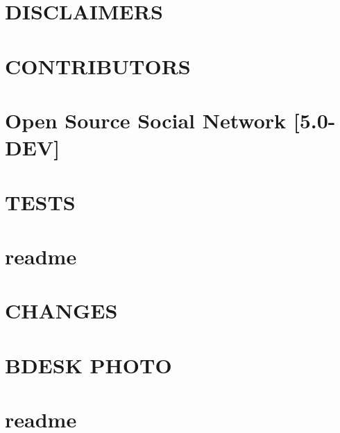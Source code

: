 \documentclass[twoside]{book}
\newcommand{\+}{\discretionary{\mbox{\scriptsize$\hookleftarrow$}}{}{}}
\begin{document}
\chapter{D\+I\+S\+C\+L\+A\+I\+M\+E\+RS}
\label{md__home_jj_Projects_ASN_CONTRIBUTING}
\hypertarget{md__home_jj_Projects_ASN_CONTRIBUTING}{}

\chapter{C\+O\+N\+T\+R\+I\+B\+U\+T\+O\+RS}
\label{md__home_jj_Projects_ASN_CONTRIBUTORS}
\hypertarget{md__home_jj_Projects_ASN_CONTRIBUTORS}{}

\chapter{Open Source Social Network \mbox{[}5.0-\/\+D\+EV\mbox{]}}
\label{md__home_jj_Projects_ASN_README}
\hypertarget{md__home_jj_Projects_ASN_README}{}

\chapter{T\+E\+S\+TS}
\label{md__home_jj_Projects_ASN_TESTS}
\hypertarget{md__home_jj_Projects_ASN_TESTS}{}

\chapter{readme}
\label{md__home_jj_Projects_ASN_vendors_tinymce_langs_readme}
\hypertarget{md__home_jj_Projects_ASN_vendors_tinymce_langs_readme}{}

\chapter{C\+H\+A\+N\+G\+ES}
\label{md__home_jj_Projects_ASN_vendors_tinymce_plugins_bdesk_photo_CHANGES}
\hypertarget{md__home_jj_Projects_ASN_vendors_tinymce_plugins_bdesk_photo_CHANGES}{}

\chapter{B\+D\+E\+SK P\+H\+O\+TO}
\label{md__home_jj_Projects_ASN_vendors_tinymce_plugins_bdesk_photo_README}
\hypertarget{md__home_jj_Projects_ASN_vendors_tinymce_plugins_bdesk_photo_README}{}

\chapter{readme}
\label{md__home_jj_Projects_ASN_vendors_tinymce_skins_lightgray_fonts_readme}
\hypertarget{md__home_jj_Projects_ASN_vendors_tinymce_skins_lightgray_fonts_readme}{}

\end{document}
